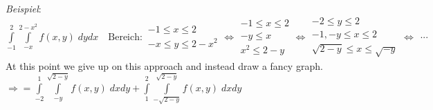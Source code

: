 \documentclass[12pt,a4paper,titlepage]{article}
\begin{document}
\\
\textit{Beispiel}: $\int\limits_{-1}^2\int\limits_{-x}^{2-x^2}f(x,y) \;dydx \quad \text{Bereich}: \substack{-1\leq x\leq 2 \\ -x\leq y\leq 2-x^2} \iff \substack{-1\leq x\leq 2 \\ -y\leq x \\ x^2\leq 2-y} \iff \substack{-2\leq y\leq 2 \\ -1,-y\leq x\leq 2 \\ \sqrt{2-y}\leq x\leq \sqrt{-y}} \iff \substack{...}$ \\
At this point we give up on this approach and instead draw a fancy graph. \\
$\Rightarrow =\int\limits_{-2}^1\int\limits_{-y}^{\sqrt{2-y}}f(x,y) \;dxdy+\int\limits_1^2\int\limits_{-\sqrt{2-y}}^{\sqrt{2-y}}f(x,y) \;dxdy$ \\
\end{document}
